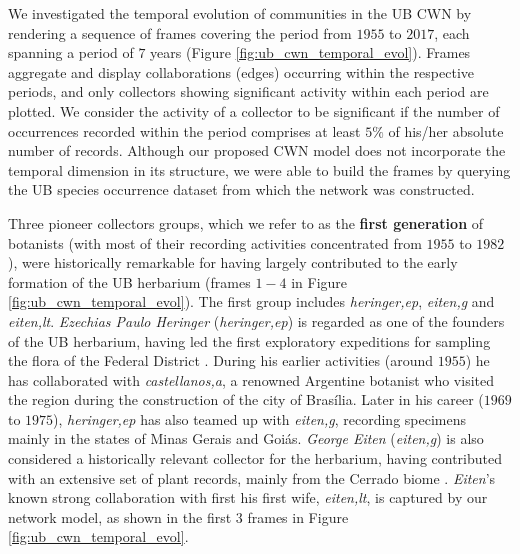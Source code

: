We investigated the temporal evolution of communities in the UB CWN by rendering a sequence of frames covering the period from $1955$ to $2017$, each spanning a period of $7$ years (Figure \ref{fig:ub_cwn_temporal_evol}).
Frames aggregate and display collaborations (edges) occurring within the respective periods, and only collectors showing significant activity within each period are plotted.
We consider the activity of a collector to be significant if the number of occurrences recorded within the period comprises at least $5\%$ of his/her absolute number of records.
Although our proposed CWN model does not incorporate the temporal dimension in its structure, we were able to build the frames by querying the UB species occurrence dataset from which the network was constructed.

Three pioneer collectors groups, which we refer to as the \textbf{first generation} of botanists (with most of their recording activities concentrated from $1955$ to $1982$), were historically remarkable for having largely contributed to the early formation of the UB herbarium (frames $1-4$ in Figure \ref{fig:ub_cwn_temporal_evol}).
The first group includes \textit{heringer,ep}, \textit{eiten,g} and \textit{eiten,lt}.
\textit{Ezechias Paulo Heringer} (\textit{heringer,ep}) is regarded as one of the founders of the UB herbarium, having led the first exploratory expeditions for sampling the flora of the Federal District \cite{Walter2001}.
During his earlier activities (around $1955$) he has collaborated with \textit{castellanos,a}, a renowned Argentine botanist who visited the region during the construction of the city of Brasília.
Later in his career ($1969$ to $1975$), \textit{heringer,ep} has also teamed up with \textit{eiten,g}, recording specimens mainly in the states of Minas Gerais and Goiás.
\textit{George Eiten} (\textit{eiten,g}) is also considered a historically relevant collector for the herbarium, having contributed with an extensive set of plant records, mainly from the Cerrado biome \cite{Gomes2012}.
\textit{Eiten}'s known strong collaboration with first his first wife, \textit{eiten,lt}, is captured by our network model, as shown in the first $3$ frames in Figure \ref{fig:ub_cwn_temporal_evol}.


